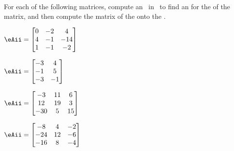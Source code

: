 \begin{exercise} \label{ex:orprmat} 
For each of the following matrices, compute an \svd\ in \script\ to find an  for the  of the matrix, and then compute the matrix of the  onto the .
\begin{Parts}
\item \(\eAii=\begin{bmatrix} 0&-2&4
\\4&-1&-14
\\1&-1&-2 \end{bmatrix}\)

\item \(\eAii=\begin{bmatrix} -3&4
\\-1&5
\\-3&-1 \end{bmatrix}\)

\begin{reduce}
\item \(\eAii=\begin{bmatrix} -3&11&6
\\12&19&3
\\-30&5&15 \end{bmatrix}\)

\item \(\eAii=\begin{bmatrix} -8&4&-2
\\-24&12&-6
\\-16&8&-4 \end{bmatrix}\)


\end{reduce}
\end{Parts}
\end{exercise}
